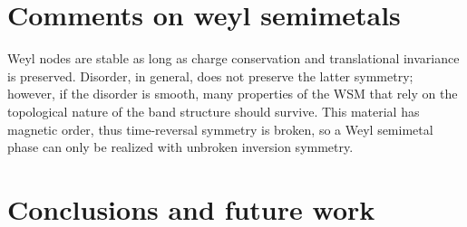 \documentclass[preprint,pre,floats,aps,amsmath,amssymb]{revtex4}
\begin{document}

\section{Comments on weyl semimetals}

Weyl nodes are stable as long as charge conservation and translational invariance is preserved. Disorder, in general, does not preserve the latter symmetry; however, if the disorder is smooth, many properties of the WSM that rely on the topological nature of the band structure should survive.
This material has magnetic order, thus time-reversal symmetry is broken, so a Weyl semimetal phase can only be realized with unbroken inversion symmetry.

 
\section{Conclusions and future work}
\label{sec:conclusion}




{}

\end{document}
